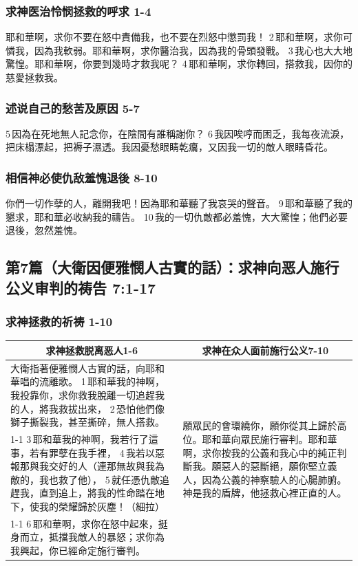 \subsubsection{求神医治怜悯拯救的呼求 1-4}  
耶和華啊，求你不要在怒中責備我，也不要在烈怒中懲罰我！
2 耶和華啊，求你可憐我，因為我軟弱。耶和華啊，求你醫治我，因為我的骨頭發戰。
3 我心也大大地驚惶。耶和華啊，你要到幾時才救我呢？
4 耶和華啊，求你轉回，搭救我，因你的慈愛拯救我。  
\subsubsection{述说自己的愁苦及原因 5-7}  
5 因為在死地無人記念你，在陰間有誰稱謝你？
6 我因唉哼而困乏，我每夜流淚，把床榻漂起，把褥子濕透。我因憂愁眼睛乾癟，又因我一切的敵人眼睛昏花。
\subsubsection{相信神必使仇敌羞愧退後 8-10}
你們一切作孽的人，離開我吧！因為耶和華聽了我哀哭的聲音。
9 耶和華聽了我的懇求，耶和華必收納我的禱告。
10 我的一切仇敵都必羞愧，大大驚惶；他們必要退後，忽然羞愧。

\subsection{第7篇（大衛因便雅憫人古實的話）：求神向恶人施行公义审判的祷告  7:1-17}
\subsubsection{求神拯救的祈祷 1-10}
\begin{table}[H]
\centering
\begin{tabular}{p{}|p{}}\hline\hline
\multicolumn{1}{c|}{求神拯救脱离恶人1-6}&\multicolumn{1}{c}{求神在众人面前施行公义7-10}\\\hline
大衛指著便雅憫人古實的話，向耶和華唱的流離歌。
1 耶和華我的神啊，我投靠你，求你救我脫離一切追趕我的人，將我救拔出來，
2 恐怕他們像獅子撕裂我，甚至撕碎，無人搭救。
&\multirow{3}{14.em}{願眾民的會環繞你，願你從其上歸於高位。耶和華向眾民施行審判。耶和華啊，求你按我的公義和我心中的純正判斷我。願惡人的惡斷絕，願你堅立義人，因為公義的神察驗人的心腸肺腑。神是我的盾牌，他拯救心裡正直的人。}\\\cline{1-1}
3 耶和華我的神啊，我若行了這事，若有罪孽在我手裡，
4 我若以惡報那與我交好的人（連那無故與我為敵的，我也救了他），
5 就任憑仇敵追趕我，直到追上，將我的性命踏在地下，使我的榮耀歸於灰塵！（細拉）&\\\cline{1-1}
6 耶和華啊，求你在怒中起來，挺身而立，抵擋我敵人的暴怒；求你為我興起，你已經命定施行審判。&\\\hline
\end{tabular}
\end{table} 


